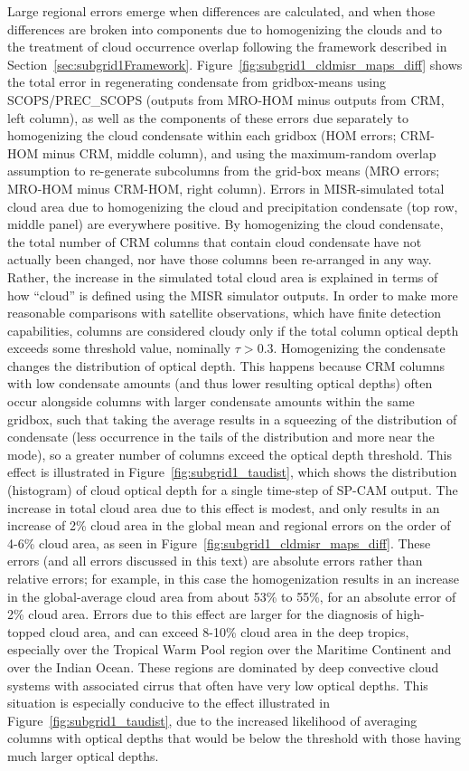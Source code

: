 Large regional errors emerge when differences are calculated, and when
those differences are broken into components due to homogenizing the
clouds and to the treatment of cloud occurrence overlap following the
framework described in Section~\ref{sec:subgrid1Framework}.
Figure~\ref{fig:subgrid1_cldmisr_maps_diff} shows the total error in
regenerating condensate from gridbox-means using SCOPS/PREC\_SCOPS
(outputs from MRO-HOM minus outputs from CRM, left column), as well as
the components of these errors due separately to homogenizing the cloud
condensate within each gridbox (HOM errors; CRM-HOM minus CRM, middle
column), and using the maximum-random overlap assumption to re-generate
subcolumns from the grid-box means (MRO errors; MRO-HOM minus CRM-HOM,
right column). Errors in MISR-simulated total cloud area due to
homogenizing the cloud and precipitation condensate (top row, middle
panel) are everywhere positive. By homogenizing the cloud condensate,
the total number of CRM columns that contain cloud condensate have not
actually been changed, nor have those columns been re-arranged in any
way. Rather, the increase in the simulated total cloud area is explained
in terms of how ``cloud'' is defined using the MISR simulator outputs.
In order to make more reasonable comparisons with satellite
observations, which have finite detection capabilities, columns are
considered cloudy only if the total column optical depth exceeds some
threshold value, nominally \(\tau > 0.3\). Homogenizing the condensate
changes the distribution of optical depth. This happens because CRM
columns with low condensate amounts (and thus lower resulting optical
depths) often occur alongside columns with larger condensate amounts
within the same gridbox, such that taking the average results in a
squeezing of the distribution of condensate (less occurrence in the
tails of the distribution and more near the mode), so a greater number
of columns exceed the optical depth threshold. This effect is
illustrated in Figure~\ref{fig:subgrid1_taudist}, which shows the
distribution (histogram) of cloud optical depth for a single time-step
of SP-CAM output. The increase in total cloud area due to this effect is
modest, and only results in an increase of 2\% cloud area in the global
mean and regional errors on the order of 4-6\% cloud area, as seen in
Figure~\ref{fig:subgrid1_cldmisr_maps_diff}. These errors (and all
errors discussed in this text) are absolute errors rather than relative
errors; for example, in this case the homogenization results in an
increase in the global-average cloud area from about 53\% to 55\%, for
an absolute error of 2\% cloud area. Errors due to this effect are
larger for the diagnosis of high-topped cloud area, and can exceed
8-10\% cloud area in the deep tropics, especially over the Tropical Warm
Pool region over the Maritime Continent and over the Indian Ocean. These
regions are dominated by deep convective cloud systems with associated
cirrus that often have very low optical depths. This situation is
especially conducive to the effect illustrated in
Figure~\ref{fig:subgrid1_taudist}, due to the increased likelihood of
averaging columns with optical depths that would be below the threshold
with those having much larger optical depths.

